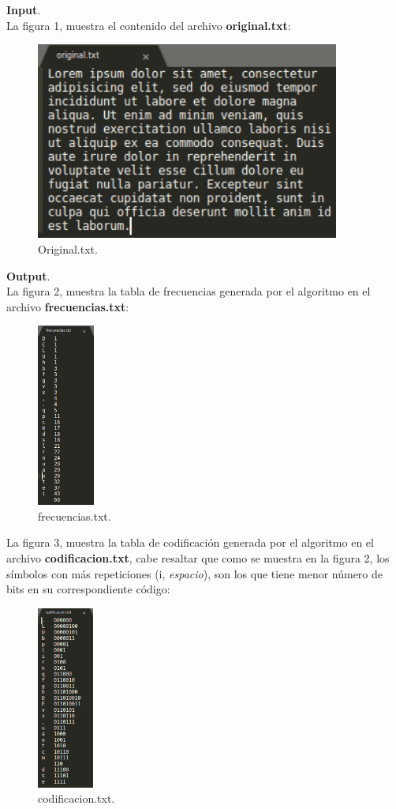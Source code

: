\documentclass[12pt]{report}
\begin{document}
	\textbf{Input}.\\
	La figura 1, muestra el contenido del archivo \textbf{original.txt}: 
		\begin{figure}[H]
			\includegraphics[width=10cm]{imagenes/1.png}
			\centering
			\caption{Original.txt.}
			\centering
		\end{figure}	
		
		\newpage 
		
	\textbf{Output}.\\	
La figura 2, muestra la tabla de frecuencias generada por el algoritmo en el archivo \textbf{frecuencias.txt}:
	\begin{figure}[H]
		\includegraphics[height=6cm]{imagenes/2.png}
		\centering
		\caption{frecuencias.txt.}
		\centering
	\end{figure}
	
La figura 3, muestra la tabla de codificación generada por el algoritmo en el archivo \textbf{codificacion.txt}, cabe resaltar que como se muestra en la figura 2, los símbolos con más repeticiones (i, \textit{espacio}), son los que tiene menor número de bits en su correspondiente código:
\begin{figure}[H]
	\includegraphics[height=6cm]{imagenes/3.png}
	\centering
	\caption{codificacion.txt.}
	\centering
\end{figure}
	  \newpage
	  
\end{document}
